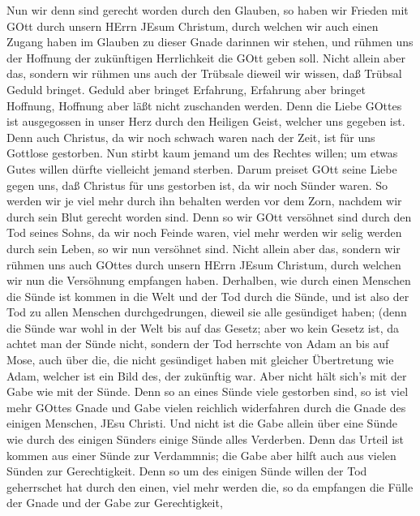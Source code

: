  Nun wir denn sind gerecht worden durch den Glauben, so
haben wir Frieden mit GOtt durch unsern HErrn JEsum Christum,
 durch welchen wir auch einen Zugang haben im Glauben zu
dieser Gnade darinnen wir stehen, und rühmen uns der Hoffnung der
zukünftigen Herrlichkeit die GOtt geben soll.  Nicht allein
aber das, sondern wir rühmen uns auch der Trübsale dieweil wir wissen,
daß Trübsal Geduld bringet.  Geduld aber bringet Erfahrung,
Erfahrung aber bringet Hoffnung,  Hoffnung aber läßt nicht
zuschanden werden. Denn die Liebe GOttes ist ausgegossen in unser Herz
durch den Heiligen Geist, welcher uns gegeben ist.  Denn
auch Christus, da wir noch schwach waren nach der Zeit, ist für uns
Gottlose gestorben.  Nun stirbt kaum jemand um des Rechtes
willen; um etwas Gutes willen dürfte vielleicht jemand sterben.
 Darum preiset GOtt seine Liebe gegen uns, daß Christus für
uns gestorben ist, da wir noch Sünder waren.  So werden wir
je viel mehr durch ihn behalten werden vor dem Zorn, nachdem wir durch
sein Blut gerecht worden sind.  Denn so wir GOtt versöhnet
sind durch den Tod seines Sohns, da wir noch Feinde waren, viel mehr
werden wir selig werden durch sein Leben, so wir nun versöhnet sind.
 Nicht allein aber das, sondern wir rühmen uns auch GOttes
durch unsern HErrn JEsum Christum, durch welchen wir nun die Versöhnung
empfangen haben.  Derhalben, wie durch einen Menschen die
Sünde ist kommen in die Welt und der Tod durch die Sünde, und ist also
der Tod zu allen Menschen durchgedrungen, dieweil sie alle gesündiget
haben;  (denn die Sünde war wohl in der Welt bis auf das
Gesetz; aber wo kein Gesetz ist, da achtet man der Sünde nicht,
 sondern der Tod herrschte von Adam an bis auf Mose, auch
über die, die nicht gesündiget haben mit gleicher Übertretung wie Adam,
welcher ist ein Bild des, der zukünftig war.  Aber nicht
hält sich's mit der Gabe wie mit der Sünde. Denn so an eines Sünde viele
gestorben sind, so ist viel mehr GOttes Gnade und Gabe vielen reichlich
widerfahren durch die Gnade des einigen Menschen, JEsu Christi.
 Und nicht ist die Gabe allein über eine Sünde wie durch
des einigen Sünders einige Sünde alles Verderben. Denn das Urteil ist
kommen aus einer Sünde zur Verdammnis; die Gabe aber hilft auch aus
vielen Sünden zur Gerechtigkeit.  Denn so um des einigen
Sünde willen der Tod geherrschet hat durch den einen, viel mehr werden
die, so da empfangen die Fülle der Gnade und der Gabe zur Gerechtigkeit,
